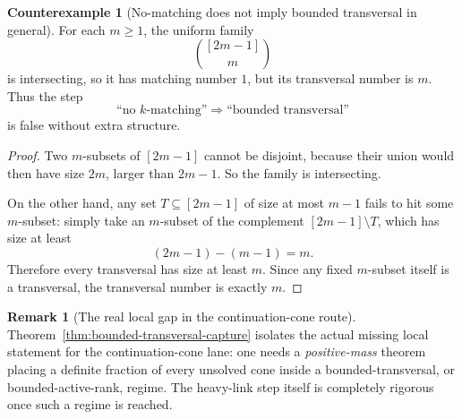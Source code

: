 \documentclass[11pt]{article}
\theoremstyle{definition}
\newtheorem{counterexample}[theorem]{Counterexample}
\newtheorem{remark}[theorem]{Remark}
\newcommand{\1}{\mathbf{1}}
\begin{document}
\begin{counterexample}[No-matching does not imply bounded transversal in general]\label{ce:no-matching-no-transversal}
For each $m\ge 1$, the uniform family
\[
\binom{[2m-1]}{m}
\]
is intersecting, so it has matching number $1$, but its transversal number is $m$.
Thus the step
\[
\text{``no }k\text{-matching''}\Longrightarrow \text{``bounded transversal''}
\]
is false without extra structure.
\end{counterexample}

\begin{proof}
Two $m$-subsets of $[2m-1]$ cannot be disjoint, because their union would then have size $2m$, larger than $2m-1$.
So the family is intersecting.

On the other hand, any set $T\subseteq [2m-1]$ of size at most $m-1$ fails to hit some $m$-subset:
simply take an $m$-subset of the complement $[2m-1]\setminus T$, which has size at least
\[
(2m-1)-(m-1)=m.
\]
Therefore every transversal has size at least $m$.
Since any fixed $m$-subset itself is a transversal, the transversal number is exactly $m$.
\end{proof}

\begin{remark}[The real local gap in the continuation-cone route]\label{rem:bounded-transversal-gap}
Theorem~\ref{thm:bounded-transversal-capture} isolates the actual missing local statement for the continuation-cone lane:
one needs a \emph{positive-mass} theorem placing a definite fraction of every unsolved cone inside a bounded-transversal, or bounded-active-rank, regime.
The heavy-link step itself is completely rigorous once such a regime is reached.
\end{remark}
\end{document}
